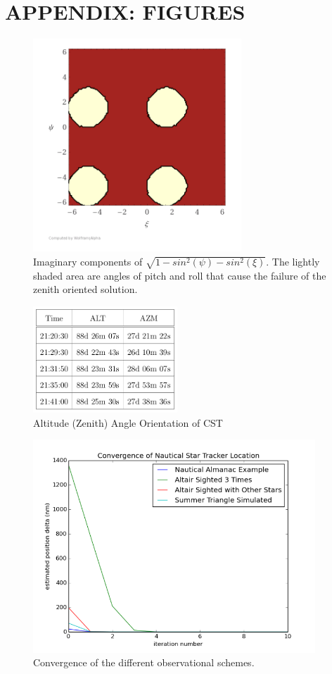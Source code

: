 \documentclass[]{aiaa-tc}%
\begin{document}
\section*{APPENDIX: FIGURES}
\begin{figure}[b!]
\centering
\includegraphics[height=8cm]{failurecase.png}
\caption{Imaginary components of $\sqrt{1-sin^{2}(\psi)-sin^{2}(\xi)}$.  The lightly shaded area are angles of pitch and roll that cause the failure of the zenith oriented solution.}
\label{f:failure}
\end{figure}
\begin{figure}[b!]
\centering
\includegraphics[height=4cm]{altitude.png}
\caption{Altitude (Zenith) Angle Orientation of CST}
\label{f:alt}
\end{figure}
\begin{figure}[b!]%
\centering
\includegraphics[height=8cm]{convergence.png}
\caption{Convergence of the different observational schemes.}
\label{f:converge}
\end{figure}
\end{document}
